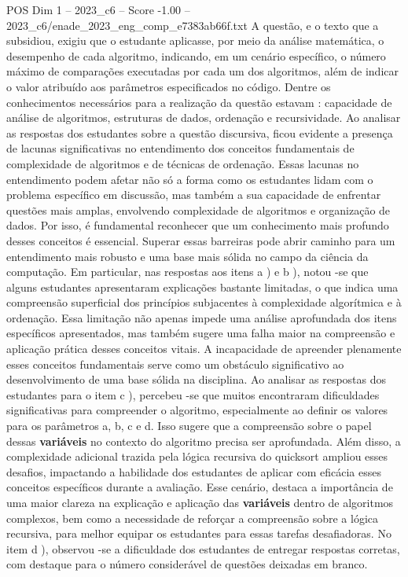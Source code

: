 \begin{textsample}{POS Dim 1 – 2023\_c6 – Score -1.00 – 2023\_c6/enade\_2023\_eng\_comp\_e7383ab66f.txt}
A questão, e o texto que a subsidiou, exigiu que o estudante aplicasse, por meio da análise matemática, o desempenho de cada algoritmo, indicando, em um cenário específico, o número máximo de comparações executadas por cada um dos algoritmos, além de indicar o valor atribuído aos parâmetros especificados no código.
Dentre os conhecimentos necessários para a realização da questão estavam : capacidade de análise de algoritmos, estruturas de dados, ordenação e recursividade.
Ao analisar as respostas dos estudantes sobre a questão discursiva, ficou evidente a presença de lacunas significativas no entendimento dos conceitos fundamentais de complexidade de algoritmos e de técnicas de ordenação.
Essas lacunas no entendimento podem afetar não só a forma como os estudantes lidam com o problema específico em discussão, mas também a sua capacidade de enfrentar questões mais amplas, envolvendo complexidade de algoritmos e organização de dados.
Por isso, é fundamental reconhecer que um conhecimento mais profundo desses conceitos é essencial.
Superar essas barreiras pode abrir caminho para um entendimento mais robusto e uma base mais sólida no campo da ciência da computação.
Em particular, nas respostas aos itens a ) e b ), notou -se que alguns estudantes apresentaram explicações bastante limitadas, o que indica uma compreensão superficial dos princípios subjacentes à complexidade algorítmica e à ordenação.
Essa limitação não apenas impede uma análise aprofundada dos itens específicos apresentados, mas também sugere uma falha maior na compreensão e aplicação prática desses conceitos vitais.
A incapacidade de apreender plenamente esses conceitos fundamentais serve como um obstáculo significativo ao desenvolvimento de uma base sólida na disciplina.
Ao analisar as respostas dos estudantes para o item c ), percebeu -se que muitos encontraram dificuldades significativas para compreender o algoritmo, especialmente ao definir os valores para os parâmetros a, b, c e d.
Isso sugere que a compreensão sobre o papel dessas \textbf{variáveis} no contexto do algoritmo precisa ser aprofundada.
Além disso, a complexidade adicional trazida pela lógica recursiva do quicksort ampliou esses desafios, impactando a habilidade dos estudantes de aplicar com eficácia esses conceitos específicos durante a avaliação.
Esse cenário, destaca a importância de uma maior clareza na explicação e aplicação das \textbf{variáveis} dentro de algoritmos complexos, bem como a necessidade de reforçar a compreensão sobre a lógica recursiva, para melhor equipar os estudantes para essas tarefas desafiadoras.
No item d ), observou -se a dificuldade dos estudantes de entregar respostas corretas, com destaque para o número considerável de questões deixadas em branco.

\end{textsample}
